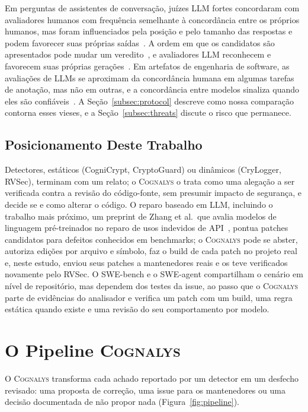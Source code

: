 \documentclass[conference]{IEEEtran}
\newcommand{\system}{\textsc{Cognalys}}
\begin{document}
Em perguntas de assistentes de conversação, juízes LLM fortes concordaram com
avaliadores humanos com frequência semelhante à concordância entre os próprios
humanos, mas foram influenciados pela posição e pelo tamanho das respostas e
podem favorecer suas próprias saídas~\cite{zheng2023judge}. A ordem em que os candidatos são
apresentados pode mudar um veredito~\cite{wang2024fair}, e avaliadores LLM
reconhecem e favorecem suas próprias
gerações~\cite{panickssery2024selfpref}. Em artefatos de engenharia de software,
as avaliações de LLMs se aproximam da concordância humana em algumas tarefas de
anotação, mas não em outras, e a concordância entre modelos sinaliza quando
eles são
confiáveis~\cite{ahmed2025annotation}. A Seção~\ref{subsec:protocol} descreve como nossa comparação contorna esses
vieses, e a Seção~\ref{subsec:threats} discute o risco que permanece.

\subsection{Posicionamento Deste Trabalho}

Detectores, estáticos (CogniCrypt, CryptoGuard) ou dinâmicos (CryLogger,
RVSec), terminam com um relato; o \system{} o trata como uma alegação a ser
verificada contra a revisão do código-fonte, sem presumir impacto de segurança,
e decide se e como alterar o código. O reparo baseado em LLM, incluindo o
trabalho mais próximo, um preprint de Zhang et al.\ que avalia modelos de
linguagem pré-treinados no reparo de usos indevidos de
API~\cite{zhang2023apimisuse}, pontua patches candidatos para defeitos
conhecidos em benchmarks; o \system{} pode se abster, autoriza edições por
arquivo e símbolo, faz o build de cada patch no projeto real e, neste estudo,
enviou seus patches a mantenedores reais e os teve verificados novamente pelo
RVSec. O SWE-bench e o SWE-agent compartilham o cenário em nível de
repositório, mas dependem dos testes da issue, ao passo que o \system{} parte
de evidências do analisador e verifica um patch com um build, uma regra
estática quando existe e uma revisão do seu comportamento por modelo.

\section{O Pipeline \system{}}
\label{sec:pipeline}
\label{subsec:library}

O \system{} transforma cada achado reportado por um detector em um desfecho
revisado: uma
proposta de correção, uma issue para os mantenedores ou uma decisão documentada
de não propor nada (Figura~\ref{fig:pipeline}).
\end{document}
